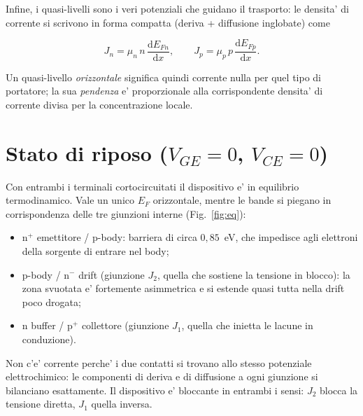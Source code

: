 \documentclass[11pt,a4paper]{article}
\begin{document}
Infine, i quasi-livelli sono i veri potenziali che guidano il trasporto: le
densita' di corrente si scrivono in forma compatta (deriva + diffusione
inglobate) come

\begin{equation}
J_n = \mu_n\, n\, \frac{\mathrm{d}E_{Fn}}{\mathrm{d}x},
\qquad
J_p = \mu_p\, p\, \frac{\mathrm{d}E_{Fp}}{\mathrm{d}x}.
\end{equation}

Un quasi-livello \emph{orizzontale} significa quindi corrente nulla per quel
tipo di portatore; la sua \emph{pendenza} e' proporzionale alla corrispondente
densita' di corrente divisa per la concentrazione locale.

\section{Stato di riposo (\texorpdfstring{$V_{GE}=0$, $V_{CE}=0$}{VGE=0, VCE=0})}

Con entrambi i terminali cortocircuitati il dispositivo e' in equilibrio
termodinamico. Vale un unico $E_F$ orizzontale, mentre le bande si piegano in
corrispondenza delle tre giunzioni interne (Fig.~\ref{fig:eq}):

\begin{itemize}[nosep,leftmargin=1.4em]
  \item $\mathrm{n^{+}}$ emettitore / p-body: barriera di circa $0{,}85$~eV, che
        impedisce agli elettroni della sorgente di entrare nel body;
  \item p-body / $\mathrm{n^{-}}$ drift (giunzione $J_2$, quella che sostiene la
        tensione in blocco): la zona svuotata e' fortemente asimmetrica e si
        estende quasi tutta nella drift poco drogata;
  \item $\mathrm{n}$ buffer / $\mathrm{p^{+}}$ collettore (giunzione $J_1$,
        quella che inietta le lacune in conduzione).
\end{itemize}

Non c'e' corrente perche' i due contatti si trovano allo stesso potenziale
elettrochimico: le componenti di deriva e di diffusione a ogni giunzione si
bilanciano esattamente. Il dispositivo e' bloccante in entrambi i sensi:
$J_2$ blocca la tensione diretta, $J_1$ quella inversa.
\end{document}
